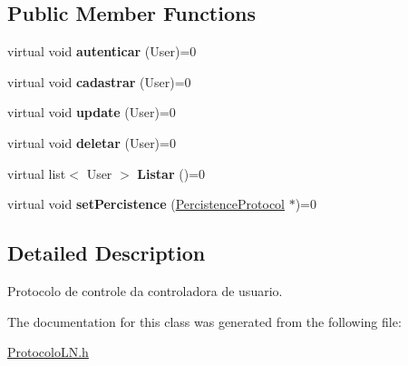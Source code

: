\subsection*{Public Member Functions}
\begin{DoxyCompactItemize}
\item 
\hypertarget{class_user_protocol_a848b4c9ad3b03384da94606c8f3f39f4}{virtual void {\bfseries autenticar} (User)=0}\label{class_user_protocol_a848b4c9ad3b03384da94606c8f3f39f4}

\item 
\hypertarget{class_user_protocol_a82ef4359d21dea2516370077eebc191f}{virtual void {\bfseries cadastrar} (User)=0}\label{class_user_protocol_a82ef4359d21dea2516370077eebc191f}

\item 
\hypertarget{class_user_protocol_a763b2abc464281839f982e6a33a19ebf}{virtual void {\bfseries update} (User)=0}\label{class_user_protocol_a763b2abc464281839f982e6a33a19ebf}

\item 
\hypertarget{class_user_protocol_a60d2fcc3efc076fadd2463980439652e}{virtual void {\bfseries deletar} (User)=0}\label{class_user_protocol_a60d2fcc3efc076fadd2463980439652e}

\item 
\hypertarget{class_user_protocol_a4da9152e6f9f128fb37467c8ee3cdca9}{virtual list$<$ User $>$ {\bfseries Listar} ()=0}\label{class_user_protocol_a4da9152e6f9f128fb37467c8ee3cdca9}

\item 
\hypertarget{class_user_protocol_acf8d6fb7d463085084cb428ec316d23a}{virtual void {\bfseries set\-Percistence} (\hyperlink{class_percistence_protocol}{Percistence\-Protocol} $\ast$)=0}\label{class_user_protocol_acf8d6fb7d463085084cb428ec316d23a}

\end{DoxyCompactItemize}


\subsection{Detailed Description}
Protocolo de controle da controladora de usuario. 

The documentation for this class was generated from the following file\-:\begin{DoxyCompactItemize}
\item 
\hyperlink{_protocolo_l_n_8h}{Protocolo\-L\-N.\-h}\end{DoxyCompactItemize}
